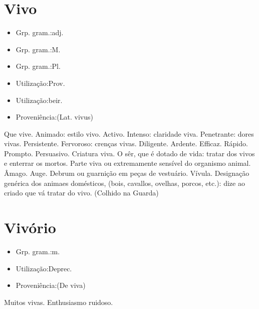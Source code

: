 \documentclass{article}
\begin{document}
\section{Vivo}
\begin{itemize}
\item {Grp. gram.:adj.}
\end{itemize}
\begin{itemize}
\item {Grp. gram.:M.}
\end{itemize}
\begin{itemize}
\item {Grp. gram.:Pl.}
\end{itemize}
\begin{itemize}
\item {Utilização:Prov.}
\end{itemize}
\begin{itemize}
\item {Utilização:beir.}
\end{itemize}
\begin{itemize}
\item {Proveniência:(Lat. \textunderscore vivus\textunderscore )}
\end{itemize}
Que vive.
Animado: \textunderscore estilo vivo\textunderscore .
Activo.
Intenso: \textunderscore claridade viva\textunderscore .
Penetrante: \textunderscore dores vivas\textunderscore .
Persistente.
Fervoroso: \textunderscore crenças vivas\textunderscore .
Diligente.
Ardente.
Efficaz.
Rápido.
Prompto.
Persuasivo.
Criatura viva.
O sêr, que é dotado de vida: \textunderscore tratar dos vivos e enterrar os mortos\textunderscore .
Parte viva ou extremamente sensível do organismo animal.
Âmago.
Auge.
Debrum ou guarnição em peças de vestuário.
Vívula.
Designação genérica dos animaes domésticos, (bois, cavallos, ovelhas, porcos, etc.): \textunderscore dize ao criado que vá tratar do vivo\textunderscore . (Colhido na Guarda)
\section{Vivório}
\begin{itemize}
\item {Grp. gram.:m.}
\end{itemize}
\begin{itemize}
\item {Utilização:Deprec.}
\end{itemize}
\begin{itemize}
\item {Proveniência:(De \textunderscore viva\textunderscore )}
\end{itemize}
Muitos vivas.
Enthusiasmo ruidoso.
\end{document}
